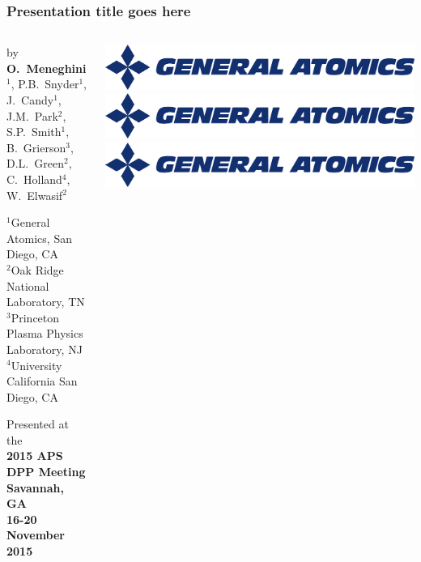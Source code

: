 \documentclass[10pt,mathserif,xcolor={table,dvipsnames},aspectratio=169]{beamer}
\begin{document}
\begin{frame}
  \frametitle{\vskip 0.5cm \huge Presentation title goes here}
  \vskip 0.2cm
  \begin{columns}
    \begin{column}{0.43\textwidth}
        \begin{minipage}[t][5.2cm][t]{\textwidth}
          {\small by}\\
          \textbf{O.~Meneghini}$^1$, P.B.~Snyder$^1$, J.~Candy$^1$,\\J.M.~Park$^2$, S.P.~Smith$^1$, B.~Grierson$^3$,\\D.L.~Green$^2$, C.~Holland$^4$, W.~Elwasif$^2$
          \vskip 0.5cm
          \begin{minipage}{\textwidth}
          \scriptsize $^1$General Atomics, San Diego, CA\\
                      $^2$Oak Ridge National Laboratory, TN\\
                      $^3$Princeton Plasma Physics Laboratory, NJ\\
                      $^4$University California San Diego, CA
          \end{minipage}
          \vskip 0.5cm
         {\small Presented at the}\\
         {\bf 2015 APS DPP Meeting\\
           Savannah, GA\\
           16-20 November 2015}
        \end{minipage}
    \end{column}
    \begin{column}{0.5\textwidth}
        \begin{minipage}[t][5.2cm][t]{\textwidth}
            \includegraphics[width=\textwidth]{../figures/General-Atomics.pdf}\\
            \includegraphics[width=\textwidth]{../figures/General-Atomics.pdf}\\
            \includegraphics[width=\textwidth]{../figures/General-Atomics.pdf}\\

\end{minipage}
\end{column}
\end{columns}
\end{frame}
\end{document}
